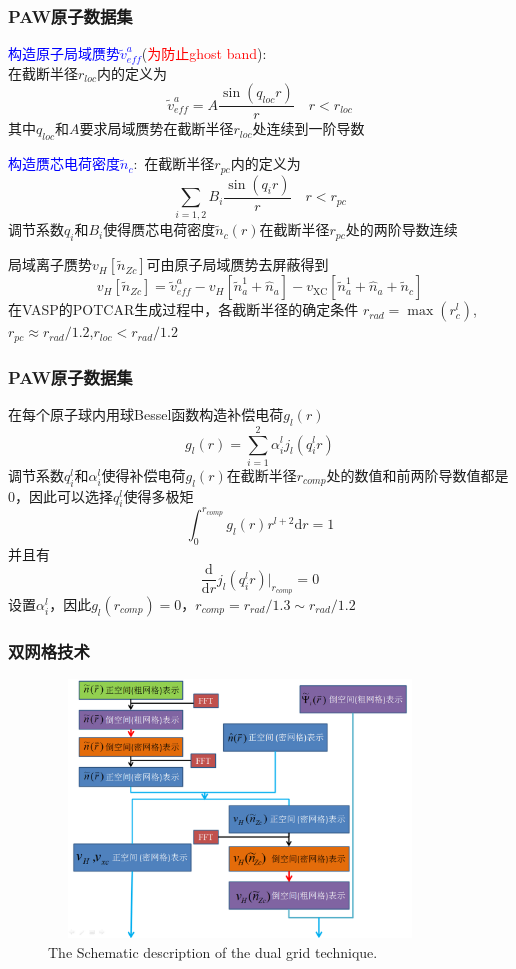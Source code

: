 \documentclass[cjk,slidestop,compress,mathserif,blue]{beamer}
\begin{document}
\frame
{
	\frametitle{\textrm{PAW}原子数据集}
	\textcolor{blue}{构造原子局域赝势$\tilde v_{eff}^a$}(\textcolor{red}{为防止\textrm{ghost band}}):\\在截断半径$r_{loc}$内的定义为
	$$\tilde v_{eff}^a=A\dfrac{\sin(q_{loc}r)}r\quad r<r_{loc}$$
	其中$q_{loc}$和$A$要求局域赝势在截断半径$r_{loc}$处连续到一阶导数

	\textcolor{blue}{构造赝芯电荷密度$\tilde n_c$}:~在截断半径$r_{pc}$内的定义为
	$$\sum_{i=1,2}B_i\dfrac{\sin(q_ir)}r\quad r<r_{pc}$$
	调节系数$q_i$和$B_i$使得赝芯电荷密度$\tilde n_c(r)$在截断半径$r_{pc}$处的两阶导数连续

	局域离子赝势$v_H[\tilde n_{Zc}]$可由原子局域赝势去屏蔽得到
	$$v_H[\tilde n_{Zc}]=\tilde v_{eff}^a-v_H[\tilde n_a^1+\hat n_a]-v_{\mathrm{XC}}[\tilde n_a^1+\hat n_a+\tilde n_c]$$
	在\textrm{VASP}的\textrm{POTCAR}生成过程中，各截断半径的确定条件
	$r_{rad}=\max({r_c^l})$,$r_{pc}\approx r_{rad}/1.2$,$r_{loc}<r_{rad}/1.2$
}

\frame
{
	\frametitle{\textrm{PAW}原子数据集}
	在每个原子球内用球\textrm{Bessel}函数构造补偿电荷$g_l(r)$
	$$g_l(r)=\sum_{i=1}^2\alpha_i^lj_l(q_i^lr)$$
	调节系数$q_i^l$和$\alpha_i^l$使得补偿电荷$g_l(r)$在截断半径$r_{comp}$处的数值和前两阶导数值都是0，因此可以选择$q_i^l$使得多极矩
	$$\int_0^{r_{comp}}g_l(r)r^{l+2}\mathrm{d}r=1$$
	并且有
	$$\dfrac{\mathrm{d}}{\mathrm{d}r}j_l(q_i^lr)\bigg|_{r_{comp}}=0$$
	设置$\alpha_i^l$，因此$g_l(r_{comp})=0$，$r_{comp}=r_{rad}/1.3\sim r_{rad}/1.2$
}

\frame
{
	\frametitle{双网格技术}
\begin{figure}[h!]
	\vspace{-0.2in}
\centering
\includegraphics[height=2.7in,width=4.0in,viewport=0 0 1180 875,clip]{Figures/dual_grid.png}
\caption{\small \textrm{The Schematic description of the dual grid technique.}}%
\label{PAW_baiseset}
\end{figure} 
}
\end{document}
